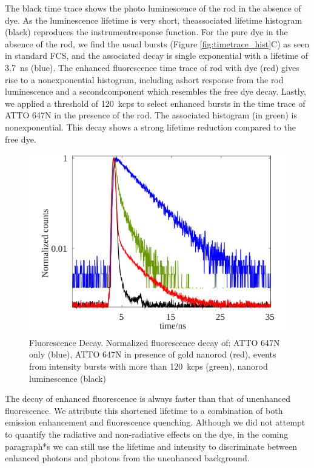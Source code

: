 The black time trace shows the photo luminescence of the rod in the absence of dye.
As the luminescence lifetime is very short, theassociated lifetime histogram (black) reproduces the instrumentresponse function.
For the pure dye in the absence of the rod, we ﬁnd the usual bursts (Figure \ref{fig:timetrace_hist}C) as seen in standard FCS, and the associated decay is single exponential with a lifetime of \SI{3.7}{\ns} (blue).
The enhanced ﬂuorescence time trace of rod with dye (red) gives rise to a nonexponential histogram, including ashort response from the rod luminescence and a secondcomponent which resembles the free dye decay.
Lastly, we applied a threshold of \SI{120}{kcps} to select enhanced bursts in the time trace of ATTO 647N in the presence of the rod.
The associated histogram (in green) is nonexponential.
This decay shows a strong lifetime reduction compared to the free dye.
\begin{figure}
	\centering
	\includegraphics[]{lifetime_enhnc}
	\caption{Fluorescence Decay. Normalized fluorescence decay of: ATTO 647N only (blue), ATTO 647N in presence of gold nanorod (red), events from intensity bursts with more than \SI{120}{kcps} (green), nanorod luminescence (black)}
	\label{fig:lifetime_enhnc}
\end{figure}
The decay of enhanced fluorescence is always faster than that of unenhanced fluorescence.
We attribute this shortened lifetime to a combination of both emission enhancement and fluorescence quenching.
Although we did not attempt to quantify the radiative and non-radiative effects on the dye, in the coming paragraph*s we can still use the lifetime and intensity to discriminate between enhanced photons and photons from the unenhanced background.


